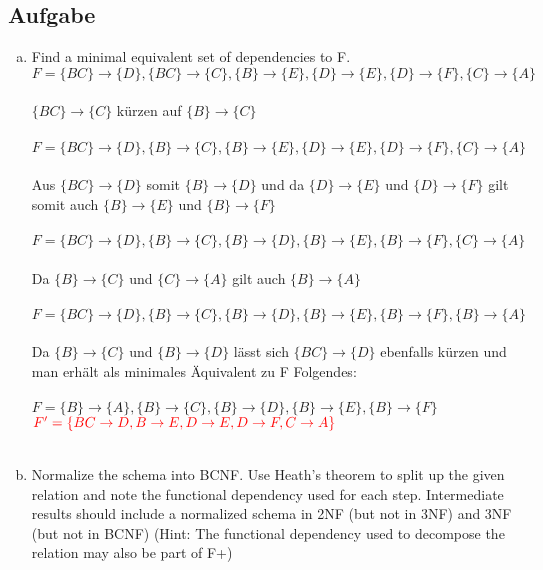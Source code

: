 \documentclass[11pt,a4paper,DIV=9]{scrartcl}
\newcounter{temp}
\newcommand{\aufgabe}[1]{
  \setcounter{temp}{\value{subsection}}
  \setcounter{subsection}{#1}
  \addtocounter{subsection}{-1}
  \subsection{Aufgabe}
  \setcounter{subsection}{\value{temp}}
}
\begin{document}
\aufgabe{4}
  \begin{enumerate}[a.]
    \item Find a minimal equivalent set of dependencies to F. \\
    $ F = \{{BC\} \rightarrow \{D}\}, \{{BC\} \rightarrow \{C}\}, \{{B\} \rightarrow \{E}\}, \{{D\} \rightarrow \{E}\}, \{{D\} \rightarrow \{F}\}, \{{C\} \rightarrow \{A}\} $ \\\\
    $ \{{BC}\} \rightarrow \{{C}\} $ k\"urzen auf 
    $ \{{B}\} \rightarrow \{{C}\} $ \\\\
    $ F = \{{BC\} \rightarrow \{D}\}, \{{B\} \rightarrow \{C}\}, \{{B\} \rightarrow \{E}\}, \{{D\} \rightarrow \{E}\}, \{{D\} \rightarrow \{F}\}, \{{C\} \rightarrow \{A}\} $ \\\\
    Aus $ \{{BC}\} \rightarrow \{{D}\} $ somit $ \{{B}\} \rightarrow \{{D}\} $ und da $ \{{D}\} \rightarrow \{{E}\} $ und $ \{{D}\} \rightarrow \{{F}\} $ gilt somit auch $ \{{B}\} \rightarrow \{{E}\} $ und $ \{{B}\} \rightarrow \{{F}\}  $ \\\\
    $ F = \{{BC\} \rightarrow \{D}\}, \{{B\} \rightarrow \{C}\}, \{{B\} \rightarrow \{D}\}, \{{B\} \rightarrow \{E}\}, \{{B\} \rightarrow \{F}\}, \{{C}\} \rightarrow \{{A}\} $ \\\\
    Da $ \{{B}\} \rightarrow \{{C}\} $ und $ \{{C}\} \rightarrow \{{A}\} $ gilt auch $ \{{B}\} \rightarrow \{{A}\} $ \\\\ $ F = \{{BC\} \rightarrow \{D}\}, \{{B\} \rightarrow \{C}\}, \{{B\} \rightarrow \{D}\}, \{{B\} \rightarrow \{E}\}, \{{B\} \rightarrow \{F}\}, \{{B}\} \rightarrow \{{A}\} $ \\\\
    Da $ \{{B}\} \rightarrow \{{C}\}  $ und $ \{{B}\} \rightarrow \{{D}\} $ l\"asst sich $ \{{BC}\} \rightarrow \{{D}\} $ ebenfalls k\"urzen und man erh\"alt als minimales \"Aquivalent zu F Folgendes: \\\\
        $ F = \{{B\} \rightarrow \{A}\}, \{{B\} \rightarrow \{C}\}, \{{B\} \rightarrow \{D}\}, \{{B\} \rightarrow \{E}\}, \{{B\} \rightarrow \{F}\} $ \\
        $ \textcolor{red}{F' = \{BC \rightarrow D, B \rightarrow E, D \rightarrow E, D \rightarrow F, C \rightarrow A \}} $ \\\\
    \item Normalize the schema into BCNF. Use Heath's theorem to split up the given relation and note the functional dependency used for each step. Intermediate results should include a normalized schema in 2NF (but not in 3NF) and 3NF (but not in BCNF) (Hint: The functional dependency used to decompose the relation may also be part of F+)
  \end{enumerate}
\end{document}
